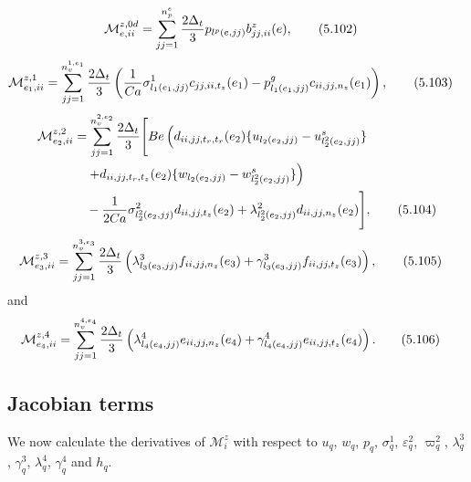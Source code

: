 \documentclass{article}
\begin{document}
\begin{align}
\mathcal{M}_{e,ii}^{z,0d} &= \sum_{jj=1}^{n_p^e} \frac{2\Delta_t}{3} p_{l^p(e,jj)} b_{jj,ii}^z(e), \tag{5.102}
\end{align}
\begin{align}
\mathcal{M}_{e_1,ii}^{z,1} &= \sum_{jj=1}^{n_v^{1,e_1}} \frac{2\Delta_t}{3} \left( \frac{1}{Ca} \sigma_{l_1(e_1,jj)}^1 c_{jj,ii,t_z}(e_1) - p_{l_1(e_1,jj)}^g c_{ii,jj,n_z}(e_1) \right), \tag{5.103}
\end{align}
\begin{align}
\mathcal{M}_{e_2,ii}^{z,2} &= \sum_{jj=1}^{n_v^{2,e_2}} \frac{2\Delta_t}{3} \Bigg[ Be \left( d_{ii,jj,t_r,t_r}(e_2) \{ u_{l_2(e_2,jj)} - u_{l_2^2(e_2,jj)}^s \} \right. \nonumber\\
&\quad \left. + d_{ii,jj,t_r,t_z}(e_2) \{ w_{l_2(e_2,jj)} - w_{l_2^2(e_2,jj)}^s \} \right) \nonumber\\
&\quad - \frac{1}{2Ca} \sigma_{l_2^2(e_2,jj)}^2 d_{ii,jj,t_z}(e_2) + \lambda_{l_2^2(e_2,jj)}^2 d_{ii,jj,n_z}(e_2) \Bigg], \tag{5.104}
\end{align}
\begin{align}
\mathcal{M}_{e_3,ii}^{z,3} &= \sum_{jj=1}^{n_v^{3,e_3}} \frac{2\Delta_t}{3} \left( \lambda_{l_3(e_3,jj)}^3 f_{ii,jj,n_z}(e_3) + \gamma_{l_3(e_3,jj)}^3 f_{ii,jj,t_z}(e_3) \right), \tag{5.105}
\end{align}
and
\begin{align}
\mathcal{M}_{e_4,ii}^{z,4} &= \sum_{jj=1}^{n_v^{4,e_4}} \frac{2\Delta_t}{3} \left( \lambda_{l_4(e_4,jj)}^4 e_{ii,jj,n_z}(e_4) + \gamma_{l_4(e_4,jj)}^4 e_{ii,jj,t_z}(e_4) \right). \tag{5.106}
\end{align}

\subsection{Jacobian terms} %
We now calculate the derivatives of $\mathcal{M}_i^z$ with respect to $u_q$, $w_q$, $p_q$, $\sigma_q^1$, $\varepsilon_q^2$, $\varpi_q^2$, $\lambda_q^3$, $\gamma_q^3$, $\lambda_q^4$, $\gamma_q^4$ and $h_q$.
\end{document}
